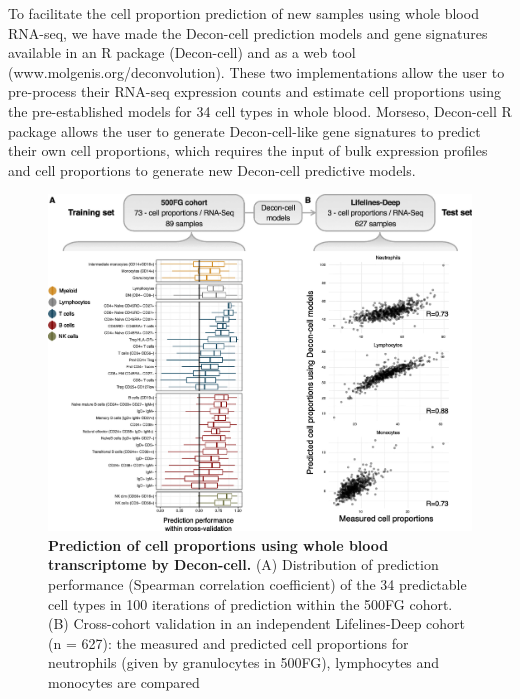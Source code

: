 To facilitate the cell proportion prediction of new samples using whole blood RNA-seq, we have made the Decon-cell prediction models and gene signatures available in an R package (Decon-cell) and as a web tool (www.molgenis.org/deconvolution). These two implementations allow the user to pre-process their RNA-seq expression counts and estimate cell proportions using the pre-established models for 34 cell types in whole blood. Morseso, Decon-cell R package allows the user to generate Decon-cell-like gene signatures to predict their own cell proportions, which requires the input of bulk expression profiles and cell proportions to generate new Decon-cell predictive models.

\begin{figure}[H]
	\includegraphics[width=\textwidth]{chapters/chapter4-deconvolution/img/fig2.png}
	\caption{\textbf{Prediction of cell proportions using whole blood transcriptome by Decon-cell.} (A) Distribution of prediction performance (Spearman correlation coefficient) of the 34 predictable cell types in 100 iterations of prediction within the 500FG cohort. (B) Cross-cohort validation in an independent Lifelines-Deep cohort (n = 627): the measured and predicted cell proportions for neutrophils (given by granulocytes in 500FG), lymphocytes and monocytes are compared}
	\label{decon_fig2}
\end{figure}


